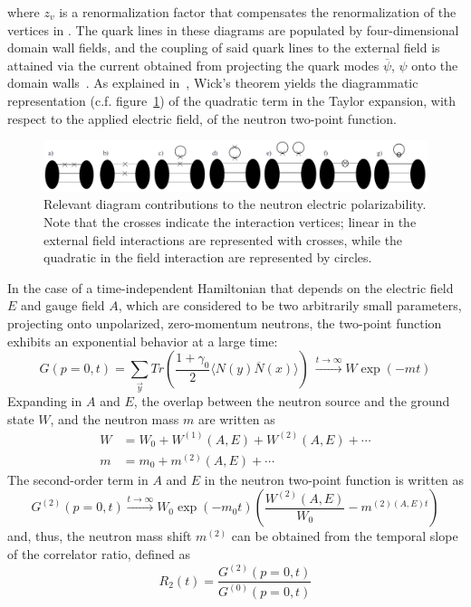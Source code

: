 where $z_v$ is a renormalization factor that compensates the renormalization of the
vertices in . The quark lines in these diagrams are populated
by four-dimensional domain wall fields, and the coupling of said quark lines to the
external field is attained via the current obtained from projecting the quark modes $\overline \psi$,
$\psi$ onto the domain walls~\cite{Engelhardt:2009ryp}.
As explained in~\cite{Engelhardt:2007ub}, Wick's theorem yields the diagrammatic 
representation (c.f. figure~\ref{fig:diagrams}) of the quadratic term in the Taylor expansion, 
with respect to the applied electric field, of the neutron two-point function.
\begin{figure}[h!]
  \includegraphics[width=15cm]{figures/diagrams.png}
  \caption{Relevant diagram contributions to the neutron electric polarizability. Note that the 
  crosses indicate the interaction vertices; linear in the external field interactions are represented with crosses, while the quadratic in the field interaction are represented by circles.}
  \label{fig:diagrams}
\end{figure}
In the case of a time-independent Hamiltonian that depends on the electric field
$E$ and gauge field $A$, which are considered to be two arbitrarily small parameters,
projecting onto unpolarized, zero-momentum neutrons, the two-point function
exhibits an exponential behavior at a large time:
\begin{equation}
G(p=0,t)=\sum_{\overrightarrow y}Tr\left(\frac{1+\gamma_0}{2}\langle N(y)\overline N(x)\rangle\right)\
\overset{t\rightarrow \infty}{\longrightarrow} W\exp(-mt)
\end{equation}
Expanding in $A$ and $E$, the overlap between the neutron source and the
ground state $W$, and the neutron mass $m$ are written as
\begin{equation}
\begin{split}
W&=W_0+W^{(1)}(A,E)+W^{(2)}(A,E)+\cdots\\
m&=m_0+m^{(2)}(A,E)+\cdots
\end{split}
\end{equation}
The second-order term in $A$ and $E$ in the neutron two-point function
is written as
\begin{equation}
G^{(2)}(p=0,t)\overset{t\rightarrow \infty}{\longrightarrow}W_0\exp(-m_0t)\left(\frac{W^{(2)}(A,E)}{W_0}-m^{(2)(A,E)t}\right)
\end{equation}
and, thus, the neutron mass shift $m^{(2)}$ can be obtained from the temporal slope of the 
correlator ratio, defined as
\begin{equation}
R_2(t)=\frac{G^{(2)}(p=0,t)}{G^{(0)}(p=0,t)}
\label{ratios}
\end{equation}
